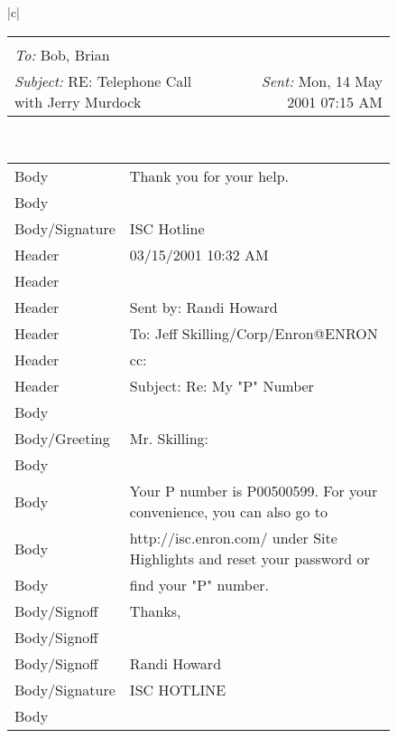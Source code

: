\documentclass{llncs}
\begin{document}
\begin{figure}[tb]
\centering
\begin{tabular}{|c|}
	\hline 
	\scriptsize{
	\begin{tabular*}{\textwidth}{@{\extracolsep{\fill}}lr}
		\makecell{
			\textit{From:} Alice\\ 
			\textit{To:} Bob, Brian\\
			\textit{Subject:} RE: Telephone Call with Jerry Murdock
		} &
		\hspace*{\fill} { \textit{Sent:} Mon, 14 May 2001 07:15 AM}
	\end{tabular*}
}
	\\ 
	\hline 
	\scriptsize{
	\begin{tabular*}{\textwidth}{l|l} 
		Body           & Thank you for your help. \\
		Body           & \\
		Body/Signature & ISC Hotline\\\hline
		Header         & 03/15/2001 10:32 AM \\
		Header         & \\
		Header         & Sent by: Randi Howard \\
		Header         & To: Jeff Skilling/Corp/Enron@ENRON\\
		Header         & cc:\\
		Header         & Subject: Re: My "P" Number\\\hline
		Body           & \\
		Body/Greeting  & Mr. Skilling: \\
		Body           & \\
		Body           & Your P number is P00500599.  For your convenience, you can also go to\\
		Body           & http://isc.enron.com/ under Site Highlights and reset your password or \\
		Body           & find your "P" number.\\
		Body/Signoff   & Thanks,\\
		Body/Signoff   & \\
		Body/Signoff   & Randi Howard\\
		Body/Signature & ISC HOTLINE\\
		Body           & \\\hline

\end{tabular*}}
\end{tabular}
\end{figure}
\end{document}

